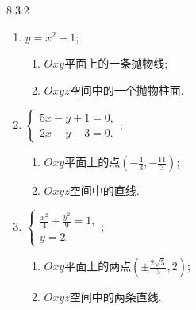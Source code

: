 \begin{exercise}{8.3.2}
\begin{enumerate}
        \item $y=x^2+1$;
        \begin{solution}
            \begin{multicols}{2}
            \begin{enumerate}
                \item $Oxy$平面上的一条抛物线;
                \item $Oxyz$空间中的一个抛物柱面.
            \end{enumerate}
            \end{multicols}
        \end{solution}

        \item $\begin{cases}
            5x-y+1=0,\\
            2x-y-3=0.
        \end{cases}$;
        \begin{solution}
            \begin{multicols}{2}
            \begin{enumerate}
                \item $Oxy$平面上的点$(-\frac{4}{3},-\frac{11}{3})$;
                \item $Oxyz$空间中的直线.
            \end{enumerate}
            \end{multicols}
        \end{solution}

        \item $\begin{cases}
            \frac{x^2}{4}+\frac{y^2}{9}=1,\\
            y=2.
        \end{cases}$;
        \begin{solution}
            \begin{multicols}{2}
            \begin{enumerate}
                \item $Oxy$平面上的两点$(\pm\frac{2\sqrt{5}}{3},2)$;
                \item $Oxyz$空间中的两条直线.
            \end{enumerate}
            \end{multicols}
        \end{solution}


\end{enumerate}
\end{exercise}
